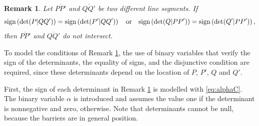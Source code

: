 \documentclass[a4paper,  review, authoryear, 1p.]{elsarticle}
\newcommand{\EB}{{E^{}_{\mathcal B}}}
\newcommand{\EBint}{{E^{int}_{\mathcal B}}}
\newcommand{\EX}{{E^{}_X}}
\newcommand{\VKMPHN}{{V_{\text{KMPHN}}}}
\newcommand{\VKMPN}{{V_{\text{KMPN}}}}
\newtheorem{remark}{Remark}
\newcommand{\CV}[1]{{\color{blue}#1}}
\newcommand{\determinant}[3]{\det({#1|#2#3})}
\begin{document}
	\begin{remark}\label{rem:determinants}
		Let $\overline{PP'}$ and $\overline{QQ'}$ be two different line segments. 
		If
		\begin{equation*}
			\normalfont{\text{sign}}\left(\determinant{P}{Q}{Q'}\right) = \normalfont{\text{sign}}\left(\determinant{P'}{Q}{Q'}\right)
			\quad
			\text{or}
			\quad
			\normalfont{\text{sign}}\left(\determinant{Q}{P}{P'}\right) = \normalfont{\text{sign}}\left(\determinant{Q'}{P}{P'}\right)
			,
		\end{equation*}
		then $\overline{PP'}$ and $\overline{QQ'}$ do not intersect.
	\end{remark}
	
	
	
	
	
	To model the conditions of Remark \ref{rem:determinants}, the use of binary variables that verify the sign of the determinants, the equality of signs, and the disjunctive condition are required, since these determinants depend on the location of $P$, $P'$, $Q$ and $Q'$.
	
	\newcommand{\LS}[3]{L_{#1#2#3}}
	\newcommand{\US}[3]{U_{#1#2#3}}
	\newcommand{\alphamas}[3]{\alpha_{#1#2#3}}
	\newcommand{\alphamenos}[3]{\alpha^{-}(#1|#2#3)}
	\newcommand{\alphapunto}[3]{\alpha^{\cdotp}(#1|#2#3)}
	
	First, the sign of each determinant in Remark \ref{rem:determinants} is modelled with \eqref{eq:alphaC}. The binary variable $\alpha$ is introduced and assumes the value one if the determinant is nonnegative and zero, otherwise. Note that determinants cannot be null, because the barriers are in general position.
	
\end{document}
